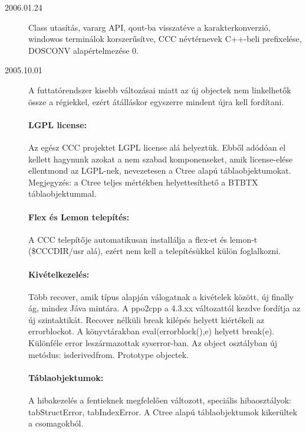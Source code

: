 \begin{description}
\label{20060124}
\item[2006.01.24]
  Class utasítás, 
  vararg API, 
  qout-ba visszatéve a karakterkonverzió,
  windowos terminálok korszerűsítve, 
  CCC névtérnevek C++-beli prefixelése,
  DOSCONV alapértelmezése 0.

\label{20051001}
\item[2005.10.01]
  A futtatórendszer kisebb változásai miatt 
  az új objectek nem linkelhetők össze a régiekkel, 
  ezért átálláskor egyszerre mindent újra kell fordítani.

  \paragraph{LGPL license:}\label{LGPL}
    Az egész CCC projektet LGPL license alá helyeztük.
    Ebből adódóan el kellett hagynunk azokat a nem szabad 
    komponenseket,  amik license-elése ellentmond az LGPL-nek,
    nevezetesen a Ctree alapú táblaobjektumokat. Megjegyzés:
    a Ctree teljes mértékben helyettesíthető a BTBTX táblaobjektummal.
  
  \paragraph{Flex és Lemon telepítés:}\label{FLEX}
    A CCC telepítője automatikusan installálja a flex-et és lemon-t
    (\$CCCDIR/usr alá), ezért nem kell a telepítésükkel külön  foglalkozni.

  \paragraph{Kivételkezelés:}\label{EXCEPTION}
    Több recover, amik típus alapján
    válogatnak a kivételek között, új finally ág, mindez Jáva mintára.
    A ppo2cpp a 4.3.xx változattól kezdve fordítja az új szintaktikát.
    Recover nélküli break kilépés helyett kiértékeli az errorblockot.
    A könyvtárakban eval(errorblock(),e) helyett break(e).
    Különféle error leszármazottak syserror-ban.
    Az object osztályban új metódus: isderivedfrom.
    Prototype objectek.

    \paragraph{Táblaobjektumok:}
    A hibakezelés a fentieknek megfelelően változott,
    speciális hibaosztályok: tabStructError, tabIndexError.
    A Ctree alapú táblaobjektumok kikerültek a csomagokból.


\end{description}
